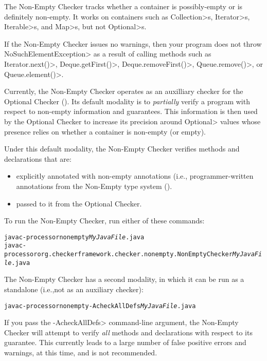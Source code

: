 \htmlhr
{}

The Non-Empty Checker tracks whether a container is possibly-empty or is
definitely non-empty.  It works on containers such as
\<Collection>s, \<Iterator>s, \<Iterable>s, and \<Map>s, but not \<Optional>s.

If the Non-Empty Checker issues no warnings, then your program does not
throw \<NoSuchElementException> as a result of calling methods such as
\<Iterator.next()>,
\<Deque.getFirst()>, \<Deque.removeFirst()>, \<Queue.remove()>, or
\<Queue.element()>.

Currently, the Non-Empty Checker operates as an auxilliary checker for the
Optional Checker ().
Its default modality is to \emph{partially} verify a program with respect to
non-empty information and guarantees.
This information is then used by the Optional Checker to increase its precision
around \<Optional> values whose presence relies on whether a container is
non-empty (or empty).

Under this default modality, the Non-Empty Checker verifies methods and
declarations that are:
\begin{itemize}

\item explicitly annotated with non-empty annotations (i.e., programmer-written
  annotations from the Non-Empty type system
  ().
\item passed to it from the Optional Checker.

\end{itemize}

To run the Non-Empty Checker, run either of these commands:

\begin{alltt}
  javac -processor nonempty \emph{MyJavaFile}.java
  javac -processor org.checkerframework.checker.nonempty.NonEmptyChecker \emph{MyJavaFile}.java
\end{alltt}

The Non-Empty Checker has a second modality, in which it can be run as a
standalone (i.e.,not as an auxiliary checker):

\begin{alltt}
  javac -processor nonempty -AcheckAllDefs \emph{MyJavaFile}.java
\end{alltt}

If you pass the \<-AcheckAllDefs> command-line argument, the Non-Empty Checker
will attempt to verify \emph{all} methods and declarations with respect to its
guarantee.
This currently leads to a large number of false positive errors and warnings,
at this time, and is not recommended.

